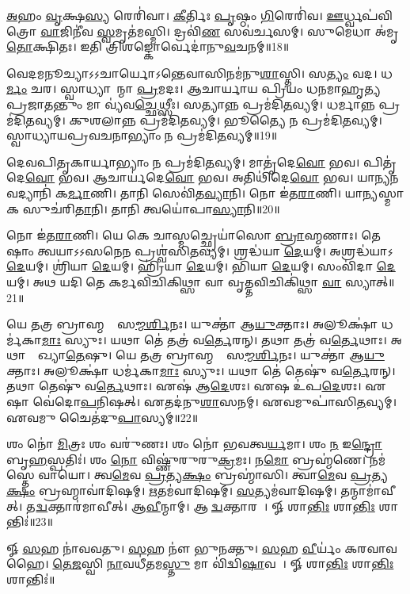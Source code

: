\ul{𑌅}𑌹𑌂 \ul{𑌵𑍃}𑌕𑍍𑌷\ul{𑌸𑍍𑌯} 𑌰𑍇𑌰𑌿॑𑌵𑌾। 
\ul{𑌕𑍀}𑌰𑍍𑌤𑌿𑌃 \ul{𑌪𑍃}𑌷𑍍𑌠𑌂 \ul{𑌗𑌿}𑌰𑍇𑌰𑌿॑𑌵। 
\ul{𑌊}𑌰𑍍𑌧𑍍𑌵𑌪॑𑌵𑌿𑌤𑍍𑌰𑍋 \ul{𑌵𑌾}𑌜𑌿𑌨𑍀॑𑌵 \ul{𑌸𑍍𑌵}𑌮𑍃𑌤॑𑌮𑌸𑍍𑌮𑌿। 
𑌦𑍍𑌰𑌵𑌿॑\ul{𑌣}\ul{} 𑌸𑌵॑𑌰𑍍𑌚𑌸𑌮𑍍। 
𑌸𑍁𑌮𑍇𑌧𑌾 𑌅॑𑌮𑍃\ul{𑌤𑍋}𑌕𑍍𑌷𑌿𑌤𑌃। 
𑌇𑌤𑌿 𑌤𑍍𑌰𑌿𑌶𑌙𑍍𑌕𑍋𑌰𑍍𑌵𑍇𑌦𑌾॑𑌨𑍁\ul{𑌵}𑌚𑌨𑌮𑍍॥18॥
\anuvakamend[\ul{𑌅}𑌹\dng{ꣳ} 𑌷𑌟𑍍]

𑌵𑍇𑌦𑌮𑌨𑍂𑌚𑍍𑌯𑌾𑌽𑌽𑌚𑌾𑌰𑍍𑌯𑍋𑌽𑌨𑍍𑌤𑍇𑌵𑌾𑌸𑌿𑌨𑌮॑𑌨𑍁\ul{𑌶𑌾}𑌸𑍍𑌤𑌿। 
𑌸\ul{𑌤𑍍𑌯𑌂} 𑌵𑌦। 
𑌧\ul{𑌰𑍍𑌮𑌂} 𑌚𑌰। 
𑌸𑍍𑌵𑌾𑌧𑍍𑌯𑌾𑌯𑌾᳚𑌨𑍍𑌮𑌾 \ul{𑌪𑍍𑌰}𑌮𑌦𑌃। 
𑌆𑌚𑌾𑌰𑍍𑌯𑌾𑌯 𑌪𑍍𑌰𑌿𑌯𑌂 𑌧𑌨𑌮𑌾𑌹𑍃𑌤𑍍𑌯 𑌪𑍍𑌰𑌜𑌾𑌤𑌨𑍍𑌤𑍁𑌂 𑌮𑌾 𑌵𑍍𑌯॑𑌵\ul{𑌚𑍍𑌛𑍇}𑌥𑍍𑌸𑍀𑌃। 
𑌸𑌤𑍍𑌯𑌾𑌨𑍍𑌨 𑌪𑍍𑌰𑌮॑𑌦𑌿\ul{𑌤}𑌵𑍍𑌯𑌮𑍍। 
𑌧𑌰𑍍𑌮𑌾𑌨𑍍𑌨 𑌪𑍍𑌰𑌮॑𑌦𑌿\ul{𑌤}𑌵𑍍𑌯𑌮𑍍। 
𑌕𑍁𑌶𑌲𑌾𑌨𑍍𑌨 𑌪𑍍𑌰𑌮॑𑌦𑌿\ul{𑌤}𑌵𑍍𑌯𑌮𑍍। 
𑌭𑍂𑌤𑍍𑌯𑍈 𑌨 𑌪𑍍𑌰𑌮॑𑌦𑌿\ul{𑌤}𑌵𑍍𑌯𑌮𑍍। 
𑌸𑍍𑌵𑌾𑌧𑍍𑌯𑌾𑌯𑌪𑍍𑌰𑌵𑌚𑌨𑌾𑌭𑍍𑌯𑌾𑌂 𑌨 𑌪𑍍𑌰𑌮॑𑌦𑌿\ul{𑌤}𑌵𑍍𑌯𑌮𑍍॥19॥

𑌦𑍇𑌵𑌪𑌿𑌤𑍃𑌕𑌾𑌰𑍍𑌯𑌾𑌭𑍍𑌯𑌾𑌂 𑌨 𑌪𑍍𑌰𑌮॑𑌦𑌿\ul{𑌤}𑌵𑍍𑌯𑌮𑍍। 
𑌮𑌾𑌤𑍃॑𑌦𑍇\ul{𑌵𑍋} 𑌭𑌵। 
𑌪𑌿𑌤𑍃॑𑌦𑍇\ul{𑌵𑍋} 𑌭𑌵। 
𑌆𑌚𑌾𑌰𑍍𑌯॑𑌦𑍇\ul{𑌵𑍋} 𑌭𑌵। 
𑌅𑌤𑌿𑌥𑌿॑𑌦𑍇\ul{𑌵𑍋} 𑌭𑌵। 
𑌯𑌾𑌨𑍍𑌯𑌨𑌵𑌦𑍍𑌯𑌾𑌨𑌿॑ 𑌕\ul{𑌰𑍍𑌮𑌾}𑌣𑌿। 
𑌤𑌾𑌨𑌿 𑌸𑍇𑌵𑌿॑𑌤\ul{𑌵𑍍𑌯𑌾}𑌨𑌿। 
𑌨𑍋 𑌇॑𑌤\ul{𑌰𑌾}𑌣𑌿। 
𑌯𑌾𑌨𑍍𑌯𑌸𑍍𑌮𑌾𑌕 𑌸𑍁𑌚॑𑌰𑌿\ul{𑌤𑌾}𑌨𑌿। 
𑌤𑌾𑌨𑌿 𑌤𑍍𑌵𑌯𑍋॑𑌪𑌾\ul{𑌸𑍍𑌯𑌾}𑌨𑌿॥20॥

𑌨𑍋 𑌇॑𑌤\ul{𑌰𑌾}𑌣𑌿। 
𑌯𑍇 𑌕𑍇 𑌚𑌾𑌸𑍍𑌮𑌚𑍍𑌛𑍍𑌰𑍇𑌯𑌾॑𑌸𑍋 \ul{𑌬𑍍𑌰𑌾}𑌹𑍍𑌮𑌣𑌾𑌃। 
𑌤𑍇𑌷𑌾𑌂 𑌤𑍍𑌵𑌯𑌾𑌽𑌽𑌸𑌨𑍇𑌨 𑌪𑍍𑌰𑌶𑍍𑌵॑𑌸𑌿\ul{𑌤}𑌵𑍍𑌯𑌮𑍍। 
𑌶𑍍𑌰𑌦𑍍𑌧॑𑌯𑌾 \ul{𑌦𑍇}𑌯𑌮𑍍। 
𑌅𑌶𑍍𑌰𑌦𑍍𑌧॑𑌯𑌾𑌽\ul{𑌦𑍇}𑌯𑌮𑍍। 
𑌶𑍍𑌰𑌿॑𑌯𑌾 \ul{𑌦𑍇}𑌯𑌮𑍍। 
𑌹𑍍𑌰𑌿॑𑌯𑌾 \ul{𑌦𑍇}𑌯𑌮𑍍। 
𑌭𑌿॑𑌯𑌾 \ul{𑌦𑍇}𑌯𑌮𑍍। 
𑌸𑌂𑌵𑌿॑𑌦𑌾 \ul{𑌦𑍇}𑌯𑌮𑍍। 
𑌅𑌥 𑌯𑌦𑌿 𑌤𑍇 𑌕𑌰𑍍𑌮𑌵𑌿𑌚𑌿𑌕𑌿𑌥𑍍𑌸𑌾 𑌵𑌾 𑌵𑍃𑌤𑍍𑌤𑌵𑌿𑌚𑌿𑌕𑌿॑𑌥𑍍𑌸𑌾 \ul{𑌵𑌾} 𑌸𑍍𑌯𑌾𑌤𑍍॥21॥

𑌯𑍇 𑌤𑌤𑍍𑌰 𑌬𑍍𑌰𑌾𑌹𑍍𑌮𑌣𑌾𑌃᳚ 𑌸\ul{𑌮𑍍𑌮}\ul{𑌰𑍍}\mbox{}𑌶𑌿𑌨𑌃। 
𑌯𑍁𑌕𑍍𑌤𑌾॑ 𑌆\ul{𑌯𑍁}𑌕𑍍𑌤𑌾𑌃। 
𑌅𑌲𑍂𑌕𑍍𑌷𑌾॑ 𑌧𑌰𑍍𑌮॑𑌕𑌾\ul{𑌮𑌾𑌃} 𑌸𑍍𑌯𑍁𑌃। 
𑌯𑌥𑌾 𑌤𑍇॑ 𑌤𑌤𑍍𑌰॑ 𑌵\ul{𑌰𑍍𑌤𑍇}𑌰𑌨𑍍। 
𑌤𑌥𑌾 𑌤𑌤𑍍𑌰॑ 𑌵\ul{𑌰𑍍𑌤𑍇}𑌥𑌾𑌃। 
𑌅𑌥𑌾𑌭𑍍𑌯𑌾᳚𑌖𑍍𑌯𑌾\ul{𑌤𑍇}𑌷𑍁। 
𑌯𑍇 𑌤𑌤𑍍𑌰 𑌬𑍍𑌰𑌾𑌹𑍍𑌮𑌣𑌾𑌃᳚ 𑌸\ul{𑌮𑍍𑌮}\ul{𑌰𑍍}\mbox{}𑌶𑌿𑌨𑌃। 
𑌯𑍁𑌕𑍍𑌤𑌾॑ 𑌆\ul{𑌯𑍁}𑌕𑍍𑌤𑌾𑌃। 
𑌅𑌲𑍂𑌕𑍍𑌷𑌾॑ 𑌧𑌰𑍍𑌮॑𑌕𑌾\ul{𑌮𑌾𑌃} 𑌸𑍍𑌯𑍁𑌃। 
𑌯𑌥𑌾 𑌤𑍇॑ 𑌤𑍇𑌷𑍁॑ 𑌵\ul{𑌰𑍍𑌤𑍇}𑌰𑌨𑍍। 
𑌤𑌥𑌾 𑌤𑍇𑌷𑍁॑ 𑌵\ul{𑌰𑍍𑌤𑍇}𑌥𑌾𑌃। 
𑌏𑌷॑ 𑌆\ul{𑌦𑍇}𑌶𑌃। 
𑌏𑌷 𑌉॑𑌪\ul{𑌦𑍇}𑌶𑌃। 
𑌏𑌷𑌾 𑌵𑍇॑𑌦𑍋\ul{𑌪}𑌨𑌿𑌷𑌤𑍍। 
𑌏𑌤𑌦॑𑌨𑍁\ul{𑌶𑌾}𑌸𑌨𑌮𑍍। 
𑌏𑌵𑌮𑍁𑌪𑌾॑𑌸𑌿\ul{𑌤}𑌵𑍍𑌯𑌮𑍍। 
𑌏𑌵𑌮𑍁 𑌚𑍈𑌤॑𑌦𑍁\ul{𑌪𑌾}𑌸𑍍𑌯𑌮𑍍॥22॥
\anuvakamend[𑌸𑍍𑌵𑌾𑌧𑍍𑌯𑌾𑌯𑌪𑍍𑌰𑌵𑌚𑌨𑌾𑌭𑍍𑌯𑌾𑌨𑍍𑌨 𑌪𑍍𑌰𑌮॑𑌦𑌿\ul{𑌤}𑌵𑍍𑌯𑌂 𑌤𑌾𑌨𑌿 𑌤𑍍𑌵𑌯𑍋॑𑌪𑌾\ul{𑌸𑍍𑌯𑌾}𑌨𑌿 𑌸𑍍𑌯𑌾𑌤𑍍𑌤𑍇𑌷𑍁॑ 𑌵\ul{𑌰𑍍𑌤𑍇}𑌰\ul{𑌨𑍍𑌥𑍍𑌸}𑌪𑍍𑌤 𑌚॑]

𑌶𑌂 𑌨𑍋॑ \ul{𑌮𑌿}𑌤𑍍𑌰𑌃 𑌶𑌂 𑌵𑌰𑍁॑𑌣𑌃। 
𑌶𑌂 𑌨𑍋॑ 𑌭𑌵𑌤𑍍𑌵\ul{𑌰𑍍𑌯}𑌮𑌾। 
𑌶𑌂 \ul{𑌨} 𑌇\ul{𑌨𑍍𑌦𑍍𑌰𑍋} 𑌬𑍃\ul{𑌹}𑌸𑍍𑌪𑌤𑌿𑌃॑। 
𑌶𑌂 \ul{𑌨𑍋} 𑌵𑌿𑌷𑍍𑌣𑍁॑𑌰𑍁𑌰𑍁\ul{𑌕𑍍𑌰}𑌮𑌃। 
𑌨\ul{𑌮𑍋} 𑌬𑍍𑌰𑌹𑍍𑌮॑𑌣𑍇। 
𑌨𑌮॑𑌸𑍍𑌤𑍇 𑌵𑌾𑌯𑍋। 
𑌤𑍍𑌵\ul{𑌮𑍇}𑌵 \ul{𑌪𑍍𑌰}𑌤𑍍𑌯\ul{𑌕𑍍𑌷𑌂} 𑌬𑍍𑌰𑌹𑍍𑌮𑌾॑𑌸𑌿। 
𑌤𑍍𑌵𑌾\ul{𑌮𑍇}𑌵 \ul{𑌪𑍍𑌰}𑌤𑍍𑌯\ul{𑌕𑍍𑌷𑌂} 𑌬𑍍𑌰𑌹𑍍𑌮𑌾𑌵𑌾॑𑌦𑌿𑌷𑌮𑍍। 
\ul{𑌋}𑌤𑌮॑𑌵𑌾𑌦𑌿𑌷𑌮𑍍। 
\ul{𑌸}𑌤𑍍𑌯𑌮॑𑌵𑌾𑌦𑌿𑌷𑌮𑍍। 
𑌤𑌨𑍍𑌮𑌾𑌮𑌾॑𑌵𑍀𑌤𑍍। 
𑌤\ul{𑌦𑍍𑌵}𑌕𑍍𑌤𑌾𑌰॑𑌮𑌾𑌵𑍀𑌤𑍍। 
𑌆\ul{𑌵𑍀}𑌨𑍍𑌮𑌾𑌮𑍍। 
𑌆𑌵𑍀᳚\ul{𑌦𑍍𑌵}𑌕𑍍𑌤𑌾𑌰𑌮𑍍᳚। 
𑍐 𑌶𑌾\ul{𑌨𑍍𑌤𑌿𑌃} 𑌶𑌾\ul{𑌨𑍍𑌤𑌿𑌃} 𑌶𑌾𑌨𑍍𑌤𑌿𑌃॑॥23॥
\anuvakamend[\ul{𑌸}𑌤𑍍𑌯𑌮॑𑌵𑌾𑌦𑌿\ul{𑌷𑌂} 𑌪𑌞𑍍𑌚॑ 𑌚]


\setcounter{anuvakam}{0}
𑍐 \ul{𑌸}𑌹 𑌨𑌾॑𑌵𑌵𑌤𑍁। 
\ul{𑌸}𑌹 𑌨𑍗॑ 𑌭𑍁𑌨𑌕𑍍𑌤𑍁। 
\ul{𑌸}𑌹 \ul{𑌵𑍀}𑌰𑍍𑌯𑌂॑ 𑌕𑌰𑌵𑌾𑌵𑌹𑍈। 
\ul{𑌤𑍇}\ul{𑌜}𑌸𑍍𑌵𑌿 \ul{𑌨𑌾}𑌵𑌧𑍀॑𑌤𑌮\ul{𑌸𑍍𑌤𑍁} 𑌮𑌾 𑌵𑌿॑𑌦𑍍𑌵𑌿\ul{𑌷𑌾}𑌵𑌹𑍈᳚। 
𑍐 𑌶𑌾\ul{𑌨𑍍𑌤𑌿𑌃} 𑌶𑌾\ul{𑌨𑍍𑌤𑌿𑌃} 𑌶𑌾𑌨𑍍𑌤𑌿𑌃॑॥%

